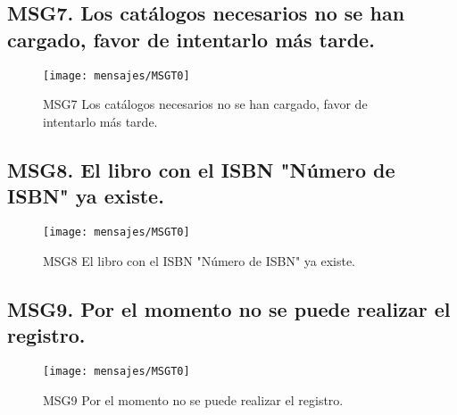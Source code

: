\subsection{MSG7. Los catálogos necesarios no se han cargado, favor de intentarlo más tarde.}
    \begin{figure}[htbp]
        \begin{center}
            \texttt{[image: mensajes/MSGT0]}
            \caption{MSG7 Los catálogos necesarios no se han cargado, favor de intentarlo más tarde.}
            \label{fig:MSG7}
        \end{center}
    \end{figure}
    
\subsection{MSG8. El libro con el ISBN "Número de ISBN" ya existe.}
    \begin{figure}[htbp]
        \begin{center}
            \texttt{[image: mensajes/MSGT0]}
            \caption{MSG8 El libro con el ISBN "Número de ISBN" ya existe.}
            \label{fig:MSG8}
        \end{center}
    \end{figure}

\subsection{MSG9. Por el momento no se puede realizar el registro.}
    \begin{figure}[htbp]
        \begin{center}
            \texttt{[image: mensajes/MSGT0]}
            \caption{MSG9 Por el momento no se puede realizar el registro.}
            \label{fig:MSG9}
        \end{center}
    \end{figure}

